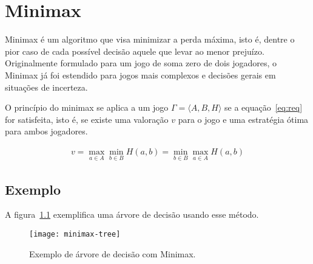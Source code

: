 \chapter{Minimax}

Minimax é um algoritmo que visa minimizar a perda máxima, isto é, dentre
o pior caso de cada possível decisão aquele que levar ao menor prejuízo.
Originalmente formulado para um jogo de soma zero de dois jogadores, o Minimax
já foi estendido para jogos mais complexos e decisões gerais em situações de
incerteza.

O princípio do minimax se aplica a um jogo $\Gamma=\langle A,B,H\rangle$ se a
equação~\ref{eq:req} for satisfeita, isto é, se existe uma valoração $v$ para o
jogo e uma estratégia ótima para ambos jogadores.
\cite{hazewinkel2002encyclopaedia}

\begin{gather}
  v=\max_{a\in A}\min_{b\in B}H(a,b)=\min_{b\in B}\max_{a\in A}H(a,b)\label{eq:req}
\end{gather}

\section{Exemplo}

A figura~\ref{fig:minimax-tree} exemplifica uma árvore de decisão usando esse
método.

\begin{figure}[ht]
  \centering
  \texttt{[image: minimax-tree]}
  \caption{Exemplo de árvore de decisão com Minimax.}\label{fig:minimax-tree}
\end{figure}


